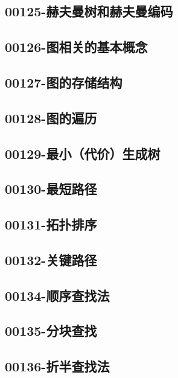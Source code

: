 \subsection{00125-赫夫曼树和赫夫曼编码}

\subsection{00126-图相关的基本概念}

\subsection{00127-图的存储结构}

\subsection{00128-图的遍历}

\subsection{00129-最小（代价）生成树}

\subsection{00130-最短路径}

\subsection{00131-拓扑排序}

\subsection{00132-关键路径}

\subsection{00134-顺序查找法}

\subsection{00135-分块查找}

\subsection{00136-折半查找法}

